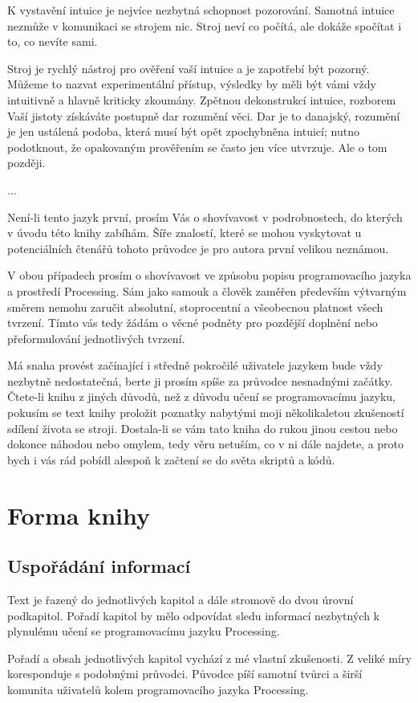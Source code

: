 \documentclass[10pt]{book}
\newcommand{\oddil}[1]{\section{#1}\index{#1}\label{#1}}
\newcommand{\pododdil}[1]{\subsection{#1}\index{#1}\label{#1}}
\begin{document}
K vystavění intuice je nejvíce nezbytná schopnost pozorování. Samotná intuice nezmůže v komunikaci se strojem nic. Stroj neví co počítá, ale dokáže spočítat i to, co nevíte sami.

Stroj je rychlý nástroj pro ověření vaší intuice a je zapotřebí být pozorný. Můžeme to nazvat experimentální přístup, výsledky by měli být vámi vždy intuitivně a hlavně kriticky zkoumány. Zpětnou dekonstrukcí intuice, rozborem Vaší jistoty získáváte postupně dar rozumění věci. Dar je to danajský, rozumění je jen ustálená podoba, která musí být opět zpochybněna intuicí; nutno podotknout, že opakovaným prověřením se často jen více utvrzuje. Ale o tom později.

...

Není-li tento jazyk první, prosím Vás o shovívavost v podrobnostech, do kterých v úvodu této knihy zabíhám. Šíře znalostí, které se mohou vyskytovat u potenciálních čtenářů tohoto průvodce je pro autora první velikou neznámou.

V obou případech prosím o shovívavost ve způsobu popisu programovacího jazyka a prostředí Processing. Sám jako samouk a člověk zaměřen především výtvarným směrem nemohu zaručit absolutní, stoprocentní a všeobecnou platnost všech tvrzení. Tímto vás tedy žádám o věcné podněty pro pozdější doplnění nebo přeformulování jednotlivých tvrzení.

Má snaha provést začínající i středně pokročilé uživatele jazykem bude vždy nezbytně nedostatečná, berte ji prosím spíše za průvodce nesnadnými začátky. Čtete-li knihu z jiných důvodů, než z důvodu učení se programovacímu jazyku, pokusím se text knihy proložit poznatky nabytými moji několikaletou zkušeností sdílení života se stroji. Dostala-li se vám tato kniha do rukou jinou cestou nebo dokonce náhodou nebo omylem, tedy věru netuším, co v ni dále najdete, a proto bych i vás rád pobídl alespoň k začtení se do světa skriptů a kódů.

\oddil{Forma knihy}

\pododdil{Uspořádání informací}

Text je řazený do jednotlivých  kapitol a dále stromově do dvou úrovní podkapitol. Pořadí kapitol by mělo odpovídat sledu informací nezbytných k plynulému učení se programovacímu jazyku Processing.

Pořadí a obsah jednotlivých kapitol vychází z mé vlastní zkušenosti. Z veliké míry koresponduje s podobnými průvodci. Původce píší samotní tvůrci a širší komunita uživatelů kolem programovacího jazyka Processing.
\end{document}
